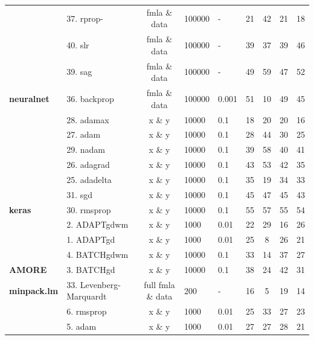 \begin{Schunk}
\begin{table}[!h]
\begin{tabular}[t]{>{}llcllcccc}
 & 37. rprop- & fmla \& data & 100000 & - & 21 & 42 & 21 & 18\\

 & 40. slr & fmla \& data & 100000 & - & 39 & 37 & 39 & 46\\

 & 39. sag & fmla \& data & 100000 & - & 49 & 59 & 47 & 52\\

\multirow{-5}{*}{\raggedright\arraybackslash \textbf{neuralnet}} & 36. backprop & fmla \& data & 100000 & 0.001 & 51 & 10 & 49 & 45\\
\cmidrule{1-9}
 & 28. adamax & x \& y & 10000 & 0.1 & 18 & 20 & 20 & 16\\

 & 27. adam & x \& y & 10000 & 0.1 & 28 & 44 & 30 & 25\\

 & 29. nadam & x \& y & 10000 & 0.1 & 39 & 58 & 40 & 41\\

 & 26. adagrad & x \& y & 10000 & 0.1 & 43 & 53 & 42 & 35\\

 & 25. adadelta & x \& y & 10000 & 0.1 & 35 & 19 & 34 & 33\\

 & 31. sgd & x \& y & 10000 & 0.1 & 45 & 47 & 45 & 43\\

\multirow{-7}{*}{\raggedright\arraybackslash \textbf{keras}} & 30. rmsprop & x \& y & 10000 & 0.1 & 55 & 57 & 55 & 54\\
\cmidrule{1-9}
 & 2. ADAPTgdwm & x \& y & 1000 & 0.01 & 22 & 29 & 16 & 26\\

 & 1. ADAPTgd & x \& y & 1000 & 0.01 & 25 & 8 & 26 & 21\\

 & 4. BATCHgdwm & x \& y & 10000 & 0.1 & 33 & 14 & 37 & 27\\

\multirow{-4}{*}{\raggedright\arraybackslash \textbf{AMORE}} & 3. BATCHgd & x \& y & 10000 & 0.1 & 38 & 24 & 42 & 31\\
\cmidrule{1-9}
\textbf{minpack.lm} & 33. Levenberg-Marquardt & full fmla \& data & 200 & - & 16 & 5 & 19 & 14\\
\cmidrule{1-9}
 & 6. rmsprop & x \& y & 1000 & 0.01 & 25 & 33 & 27 & 23\\

 & 5. adam & x \& y & 1000 & 0.01 & 27 & 27 & 28 & 21\\


\end{tabular}
\end{table}
\end{Schunk}
